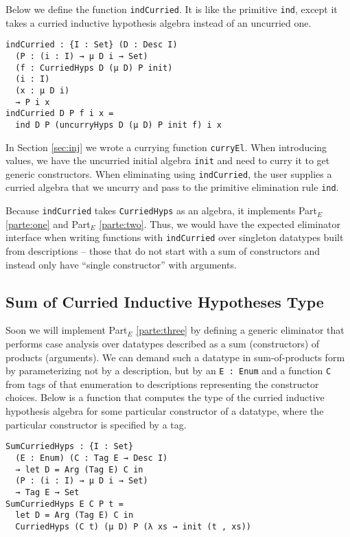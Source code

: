 \documentclass[preprint,nonatbib]{sigplanconf}
\newcommand{\refsec}[1]{Section \ref{sec:#1}}
\newcommand{\refparte}[1]{Part$_E$ \ref{parte:#1}}
\begin{document}
Below we define
the function {\tt indCurried}. It is like the primitive {\tt ind},
except it takes a curried inductive hypothesis algebra instead of an
uncurried one. 

\begin{verbatim}
indCurried : {I : Set} (D : Desc I)
  (P : (i : I) → μ D i → Set)
  (f : CurriedHyps D (μ D) P init)
  (i : I)
  (x : μ D i)
  → P i x
indCurried D P f i x =
  ind D P (uncurryHyps D (μ D) P init f) i x
\end{verbatim}

In \refsec{inj} we wrote a currying function
{\tt curryEl}. When introducing values, we have the uncurried initial
algebra {\tt init} and need to curry it to get generic constructors.
When eliminating using {\tt indCurried},
the user supplies a curried algebra that we uncurry
and pass to the primitive elimination rule {\tt ind}.

Because
{\tt indCurried} takes {\tt CurriedHyps} as an algebra, it implements
\refparte{one} and \refparte{two}.
Thus, we would have the expected eliminator interface when writing
functions with {\tt indCurried} over singleton datatypes built from
descriptions -- those that do not start with a sum of constructors and
instead only have ``single constructor'' with arguments.

\subsection{Sum of Curried Inductive Hypotheses Type}
\label{sec:elim:sum}

Soon we will implement \refparte{three} by defining a generic eliminator
that performs case analysis over datatypes described as a
sum (constructors) of products (arguments). We can demand such a
datatype in sum-of-products form by parameterizing not by a description,
but by an {\tt E : Enum} and a function {\tt C} from tags of that enumeration to
descriptions representing the constructor choices. Below is a function
that computes the type of the curried inductive hypothesis algebra for
some particular constructor of a datatype, where the particular
constructor is specified by a tag.

\begin{verbatim}
SumCurriedHyps : {I : Set}
  (E : Enum) (C : Tag E → Desc I)
  → let D = Arg (Tag E) C in
  (P : (i : I) → μ D i → Set)
  → Tag E → Set
SumCurriedHyps E C P t =
  let D = Arg (Tag E) C in
  CurriedHyps (C t) (μ D) P (λ xs → init (t , xs))
\end{verbatim}
\end{document}
